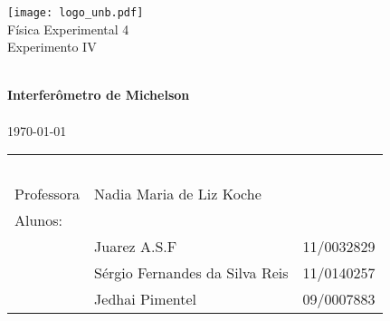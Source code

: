 \begin{titlepage}
\begin{center}

\texttt{[image: logo\_unb.pdf]}~\\[1cm]

\Huge Física Experimental 4\\[0.5cm]

\huge Experimento IV

\HRule \\[0.4cm]
{ \huge \bfseries  Interferômetro de Michelson}\\[0.4cm]

\HRule \\[0.5cm]

{\large \today}


\vfill %



	\begin{center} \large
		\begin{tabular}{llr} \
		& & \\[0.05cm]		
		Professora & Nadia Maria de Liz Koche & \\
		
		Alunos:& & \\
		& Juarez A.S.F 					& 11/0032829\\
		& Sérgio Fernandes da Silva Reis & 11/0140257\\
		& Jedhai Pimentel				& 09/0007883\\	[0.05cm]	
		\end{tabular}

	
	\end{center}


\end{center}
\end{titlepage}
